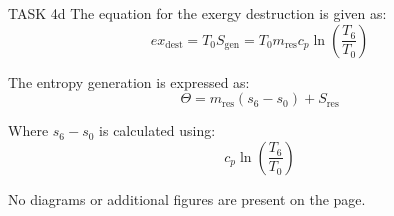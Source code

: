 TASK 4d  
The equation for the exergy destruction is given as:  
\[
ex_{\text{dest}} = T_0 S_{\text{gen}} = T_0 m_{\text{res}} c_p \ln \left( \frac{T_6}{T_0} \right)
\]  

The entropy generation is expressed as:  
\[
\Theta = m_{\text{res}} (s_6 - s_0) + S_{\text{res}}
\]  

Where \( s_6 - s_0 \) is calculated using:  
\[
c_p \ln \left( \frac{T_6}{T_0} \right)
\]  

No diagrams or additional figures are present on the page.